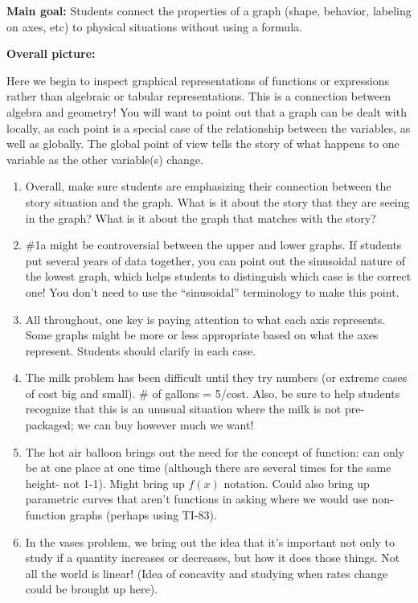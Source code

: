 \documentclass[nooutcomes,noauthor,handout]{ximera}
\begin{document}
\pagebreak
\begin{instructorNotes} 

{\bf Main goal:} Students connect the properties of a graph (shape, behavior, labeling on axes, etc) to physical situations without using a formula.


{\bf Overall picture:}

Here we begin to inspect graphical representations of functions or expressions rather than algebraic or tabular representations.   This is a connection between algebra and geometry! You will want to point out that a graph can be dealt with locally, as each point is a special case of the relationship between the variables, as well as globally.  The global point of view tells the story of what happens to one variable as the other variable(s) change.


\begin{enumerate}
	\item Overall, make sure students are emphasizing their connection between the story situation and the graph. What is it about the story that they are seeing in the graph? What is it about the graph that matches with the story?
    \item \#1a might be controversial between the upper and lower graphs. If students put several years of data together, you can point out the sinusoidal nature of the lowest graph, which helps students to distinguish which case is the correct one! You don't need to use the ``sinusoidal'' terminology to make this point.
    \item All throughout, one key is paying attention to what each axis represents.  Some graphs might be more or less appropriate based on what the axes represent. Students should clarify in each case.
    \item The milk problem has been difficult until they try numbers (or extreme cases of cost big and small).  \# of gallons = 5/cost. Also, be sure to help students recognize that this is an unusual situation where the milk is not pre-packaged; we can buy however much we want!
    \item The hot air balloon brings out the need for the concept of function:  can only be at one place at one time (although there are several times for the same height- not 1-1).  Might bring up $f(x)$ notation. Could also bring up parametric curves that aren't functions in asking where we would use non-function graphs (perhaps using TI-83).
    \item In the vases problem, we bring out the idea that it's important not only to study if a quantity increases or decreases, but how it does those things.  Not all the world is linear! (Idea of concavity and studying when rates change could be brought up here).
\end{enumerate}




\end{instructorNotes}
\end{document}
